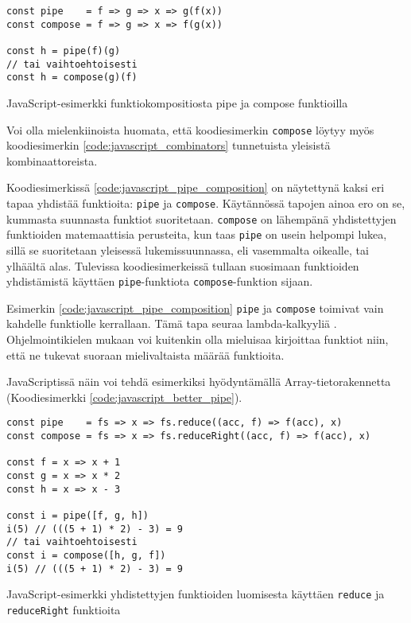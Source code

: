 \begin{code}
    \begin{verbatim}
const pipe    = f => g => x => g(f(x))
const compose = f => g => x => f(g(x))

const h = pipe(f)(g)
// tai vaihtoehtoisesti
const h = compose(g)(f)
\end{verbatim}
    \caption{JavaScript-esimerkki funktiokompositiosta pipe ja compose funktioilla}
    \label{code:javascript_pipe_composition}
\end{code}

Voi olla mielenkiinoista huomata, että koodiesimerkin \texttt{compose} löytyy myös koodiesimerkin \ref{code:javascript_combinators} tunnetuista yleisistä kombinaattoreista.

Koodiesimerkissä \ref{code:javascript_pipe_composition} on näytettynä kaksi eri tapaa yhdistää funktioita: \texttt{pipe} ja \texttt{compose}. Käytännössä tapojen ainoa ero on se, kummasta suunnasta funktiot suoritetaan. \texttt{compose} on lähempänä yhdistettyjen funktioiden matemaattisia perusteita, kun taas \texttt{pipe} on usein helpompi lukea, sillä se suoritetaan yleisessä lukemissuunnassa, eli vasemmalta oikealle, tai ylhäältä alas. Tulevissa koodiesimerkeissä tullaan suosimaan funktioiden yhdistämistä käyttäen \texttt{pipe}-funktiota \texttt{compose}-funktion sijaan. \citep{whyprefercompose}

Esimerkin \ref{code:javascript_pipe_composition} \texttt{pipe} ja \texttt{compose} toimivat vain kahdelle funktiolle kerrallaan. Tämä tapa seuraa lambda-kalkyyliä \cite{computerphile_lambda}. Ohjelmointikielen mukaan voi kuitenkin olla mieluisaa kirjoittaa funktiot niin, että ne tukevat suoraan mielivaltaista määrää funktioita.

JavaScriptissä näin voi tehdä esimerkiksi hyödyntämällä Array-tietorakennetta (Koodiesimerkki \ref{code:javascript_better_pipe}).

\begin{code}
    \begin{verbatim}
const pipe    = fs => x => fs.reduce((acc, f) => f(acc), x)
const compose = fs => x => fs.reduceRight((acc, f) => f(acc), x)

const f = x => x + 1
const g = x => x * 2
const h = x => x - 3

const i = pipe([f, g, h])
i(5) // (((5 + 1) * 2) - 3) = 9
// tai vaihtoehtoisesti 
const i = compose([h, g, f])
i(5) // (((5 + 1) * 2) - 3) = 9
\end{verbatim}
    \caption{JavaScript-esimerkki yhdistettyjen funktioiden luomisesta käyttäen \texttt{reduce} ja \texttt{reduceRight} funktioita}
    \label{code:javascript_better_pipe}
\end{code}

